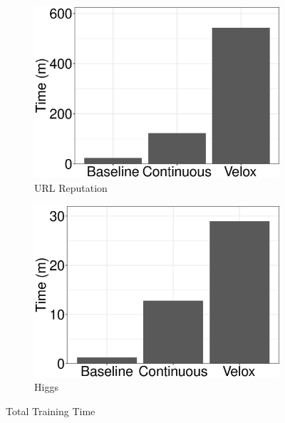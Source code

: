 \documentclass{vldb}
\begin{document}
\begin{figure}[h]
\centering
\begin{subfigure}[b]{0.5\columnwidth}
	\includegraphics[width=\linewidth, height=\linewidth,keepaspectratio]{../images/experiment-results/url-reputation-times.eps}
	\caption{URL Reputation}
	\label{fig:url-times}
\end{subfigure}%
\begin{subfigure}[b]{0.5\columnwidth}
	\includegraphics[width=\linewidth, height=\linewidth,keepaspectratio]{../images/experiment-results/higgs-times.eps}
	\caption{Higgs}
	\label{fig:higgs-times}
\end{subfigure}
\vspace{2mm}
\caption{Total Training Time}
 \label{fig:cluster-training-time}
\end{figure}
\end{document}
